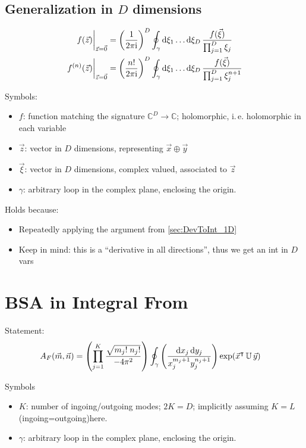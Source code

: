 \documentclass[
	english,
	a4paper,
	fontsize=10pt,
	parskip=half,
	titlepage=true,
	DIV=12,
	final
]{scrreprt}
\newcommand*{\ie}{i.\,e.\xspace}
\newcommand*{\thus}{\ensuremath{\rightarrow}\xspace}
\newcommand*{\transp}{\ensuremath{^\intercal}}
\newcommand*{\iunit}{\ensuremath{\mathrm{i}}}
\newcommand*{\setComplex}  {\ensuremath{\mathbb{C}}}
\begin{document}
\subsection{Generalization in $D$ dimensions} 
\label{sec:DevToInt_DD}
\begin{align}
	\eval{ f(\vec{z}) }_{\vec{z} = \vec{0}}
&=
	\qty(
		\frac{1}{2\pi \iunit}
	)^{D}
	\oint_{\gamma} \dd{\xi_1} \ldots \dd{\xi_D}
		\frac
			{f(\vec{\xi})}
			{\prod_{j=1}^{D} \xi_j}
\\
	\eval{ f^{(n)}(\vec{z}) }_{\vec{z} = \vec{0}}
&=
	\qty(
		\frac{n!}{2\pi \iunit}
	)^{D}
	\oint_{\gamma} \dd{\xi_1} \ldots \dd{\xi_D}
		\frac
			{f(\vec{\xi})}
			{\prod_{j=1}^{D} \xi_j^{n+1}}
\end{align}

Symbols:
\begin{itemize}
\item $f$: function matching the signature $\setComplex^{D} \thus \setComplex$; holomorphic, \ie
	holomorphic in each variable
\item $\vec{z}$: vector in $D$ dimensions, representing $\vec{x} \oplus \vec{y}$
\item $\vec{\xi}$: vector in $D$ dimensions, complex valued, associated to $\vec{z}$
\item $\gamma$: arbitrary loop in the complex plane, enclosing the origin.
\end{itemize}

Holds because:
\begin{itemize}
\item Repeatedly applying the argument from \ref{sec:DevToInt_1D}
\item Keep in mind: this is a \enquote{derivative in all directions}, thus we get an int in $D$ vars
\end{itemize}

\section{BSA in Integral From}
Statement:
\begin{align}
	A_F(\vec{m}, \vec{n})
&=
	\qty(
		\prod_{j=1}^{K}
		\frac
			{\sqrt{m_j! \; n_j!}}
			{-4\pi^{2}}
	)
	\oint_{\gamma}
		\qty(
			\frac
			{\dd{x_j} \dd{y_j}}
			{x_j^{m_j+1}  y_j^{n_j+1}}
		)
		\exp(\vec{x}\transp \, \mathbb{U} \, \vec{y})
\end{align}

Symbols
\begin{itemize}
\item $K$: number of ingoing/outgoing modes; $2K = D$; implicitly assuming $K=L$ (ingoing=outgoing)here.
\item $\gamma$: arbitrary loop in the complex plane, enclosing the origin.
\end{itemize}
\end{document}
